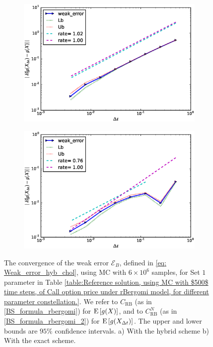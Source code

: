 \begin{figure}[h!]
	\centering
	\begin{subfigure}{.4\textwidth}
		\centering
		\includegraphics[width=1\linewidth]{./figures/rBergomi_weak_error_rates/without_richardson/H_007/weak_convergence_order_Bergomi_H_007_K_1_M_4_10_6_CI_relative_hybrid_non_hierarchical_non_parallel_asymptotic}
		\caption{}
		\label{fig:set1_weak_rate_hybrid}
	\end{subfigure}%
	\begin{subfigure}{.4\textwidth}
		\centering
		\includegraphics[width=1\linewidth]{./figures/rBergomi_weak_error_cholesky/weak_convergence_order_Bergomi_H_007_K_1_M_4_10_6_CI_relative_cholesky_non_hierarchical_non_parallel_asymptotic}
		\caption{}
		\label{fig:set1_weak_rate_exact}
	\end{subfigure}
	\caption{The convergence of the weak error $\mathcal{E}_B$,  defined in \eqref{eq: Weak_error_hyb_chol}, using MC with $6 \times 10^6$ samples, for Set $1$ parameter in Table \ref{table:Reference solution, using MC with $500$ time steps, of Call option price under rBergomi model, for different parameter constellation.}. We refer to $C_{\text{RB}}$ (as in \eqref{BS_formula_rbergomi}) for $\mathrm{E}\left[g(X)\right]$, and to $C_{\text{RB}}^{N}$ (as in \eqref{BS_formula_rbergomi_2}) for $\mathrm{E}\left[g(X_{\Delta t})\right]$. The upper and lower bounds are $95\%$ confidence intervals. a) With the hybrid scheme  b) With the exact scheme.}
	\label{fig:Weak_rate_set1_set_2_without_rich_hyb+chol}
\end{figure}
\FloatBarrier

